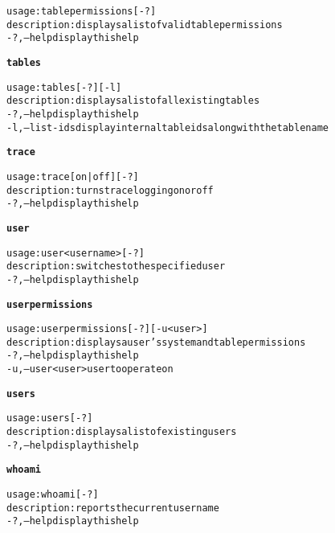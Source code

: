 \begin{alltt}
    usage: tablepermissions [-?]
    description: displays a list of valid table permissions
      -?,--help  display this help

\textbf{tables}

    usage: tables [-?] [-l]
    description: displays a list of all existing tables
      -?,--help  display this help
      -l,--list-ids  display internal table ids along with the table name

\textbf{trace}

    usage: trace [ on | off ] [-?]
    description: turns trace logging on or off
      -?,--help  display this help

\textbf{user}

    usage: user <username> [-?]
    description: switches to the specified user
      -?,--help  display this help

\textbf{userpermissions}

    usage: userpermissions [-?] [-u <user>]
    description: displays a user's system and table permissions
      -?,--help  display this help
      -u,--user <user>  user to operate on

\textbf{users}

    usage: users [-?]
    description: displays a list of existing users
      -?,--help  display this help

\textbf{whoami}

    usage: whoami [-?]
    description: reports the current user name
      -?,--help  display this help


\end{alltt}
